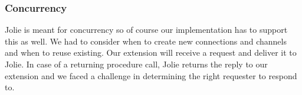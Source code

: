 \subsubsection{Concurrency}
Jolie is meant for concurrency so of course our implementation has to support this as well. We had to consider when to create new connections and channels and when to reuse existing. Our extension will receive a request and deliver it to Jolie. In case of a returning procedure call, Jolie returns the reply to our extension and we faced a challenge in determining the right requester to respond to.
\newpage